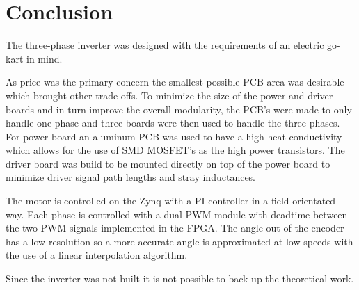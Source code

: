 \section{Conclusion}
\label{sec:conclusion}



The three-phase inverter was designed with the requirements of an electric go-kart in mind. 

As price was the primary concern the smallest possible PCB area was desirable which brought other trade-offs. 
To minimize the size of the power and driver boards and in turn improve the overall modularity, the PCB's were made to only handle one phase and three boards were then used to handle the three-phases.
For power board an aluminum PCB was used to have a high heat conductivity which allows for the use of SMD MOSFET's as the high power transistors. The driver board was build to be mounted directly on top of the power board to minimize driver signal path lengths and stray inductances.

The motor is controlled on the Zynq with a PI controller in a field orientated way. Each phase is controlled with a dual PWM module with deadtime between the two PWM signals implemented in the FPGA.
The angle out of the encoder has a low resolution so a more accurate angle is approximated at low speeds with the use of a linear interpolation algorithm. 

Since the inverter was not built it is not possible to back up the theoretical work.

